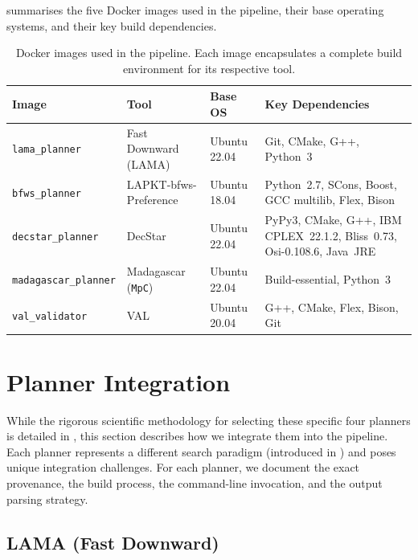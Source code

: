  summarises the five Docker images used in the pipeline, their base operating systems, and their key build dependencies.

\begin{table}[htbp]
  \centering
  \caption{Docker images used in the pipeline. Each image encapsulates a complete build environment for its respective tool.}
  \label{tab:docker_images}
  \small
  \begin{tabular}{l l l p{5.5cm}}
    \toprule
    \textbf{Image} & \textbf{Tool} & \textbf{Base OS} & \textbf{Key Dependencies} \\
    \midrule
    \texttt{lama\_planner} & Fast Downward (LAMA) & Ubuntu 22.04 & Git, CMake, G++, Python~3 \\[2pt]
    \texttt{bfws\_planner} & LAPKT-\gls{bfws}-Preference & Ubuntu 18.04 & Python~2.7, SCons, Boost, GCC multilib, Flex, Bison \\[2pt]
    \texttt{decstar\_planner} & DecStar & Ubuntu 22.04 & PyPy3, CMake, G++, IBM CPLEX~22.1.2, Bliss~0.73, Osi-0.108.6, Java~JRE \\[2pt]
    \texttt{madagascar\_planner} & Madagascar (\texttt{MpC}) & Ubuntu 22.04 & Build-essential, Python~3 \\[2pt]
    \texttt{val\_validator} & VAL & Ubuntu 20.04 & G++, CMake, Flex, Bison, Git \\
    \bottomrule
  \end{tabular}
\end{table}


\section{Planner Integration}
\label{sec:impl:planners}

While the rigorous scientific methodology for selecting these specific four planners is detailed in , this section describes how we integrate them into the pipeline.
Each planner represents a different search paradigm (introduced in ) and poses unique integration challenges.
For each planner, we document the exact provenance, the build process, the command-line invocation, and the output parsing strategy.


\subsection{LAMA (Fast Downward)}
\label{sec:impl:lama}

